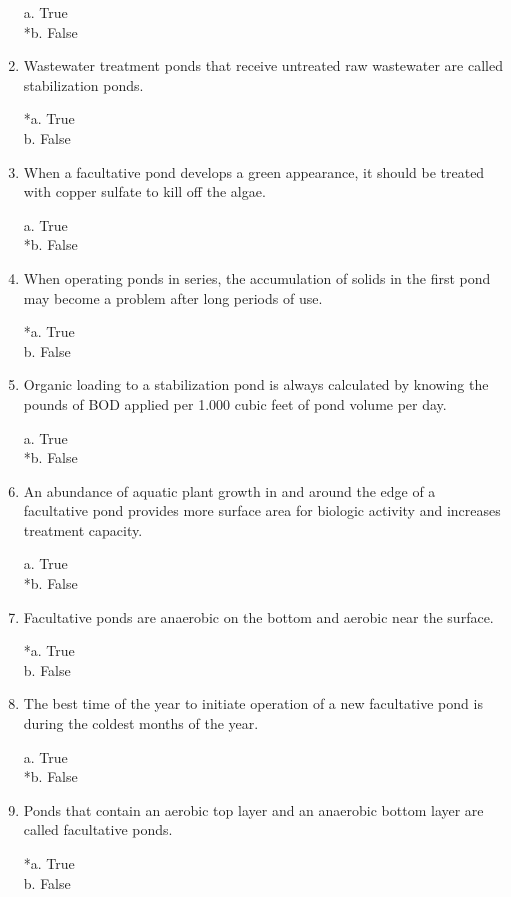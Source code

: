 \begin{enumerate}
a. True \\
*b. False 


\item  Wastewater treatment ponds that receive untreated raw wastewater are called stabilization ponds. 

*a. True \\
b. False 


\item  When a facultative pond develops a green appearance, it should be treated with copper sulfate to kill off the algae. 

a. True \\
*b. False 


\item  When operating ponds in series, the accumulation of solids in the first pond may become a problem after long periods of use. 

*a. True \\
b. False \\

\item  Organic loading to a stabilization pond is always calculated by knowing the pounds of BOD applied per 1.000 cubic feet of pond volume per day.

a. True \\
*b. False 


\item  An abundance of aquatic plant growth in and around the edge of a facultative pond provides more surface area for biologic activity and increases treatment capacity.

a. True \\
*b. False 


\item  Facultative ponds are anaerobic on the bottom and aerobic near the surface.

*a. True \\
b. False 


\item  The best time of the year to initiate operation of a new facultative pond is during the coldest months of the year.

a. True \\
*b. False 


\item  Ponds that contain an aerobic top layer and an anaerobic bottom layer are called facultative ponds.

*a. True \\
b. False 



\end{enumerate}
